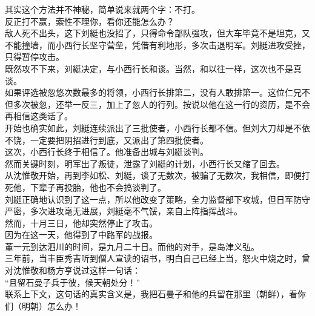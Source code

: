 \begin{multicols}{\theparacolNo}
其实这个方法并不神秘，简单说来就两个字：不打。\\

反正打不赢，索性不理你，看你还能怎么办？\\

敌人死不出头，这下刘綎也没招了，只得命令部队强攻，但大车毕竟不是坦克，又不能撞墙，而小西行长坚守营垒，凭借有利地形，多次击退明军。刘綎进攻受挫，只得暂停攻击。\\

既然攻不下来，刘綎决定，与小西行长和谈。当然，和以往一样，这次也不是真谈。\\

如果评选被忽悠次数最多的将领，小西行长排第二，没有人敢排第一。这位仁兄不但多次被忽，还举一反三，加上了忽人的行列。按说以他在这一行的资历，是不会再相信这类话了。\\

开始也确实如此，刘綎连续派出了三批使者，小西行长都不信。但刘大刀却是不依不饶，一定要把阴招进行到底，又派出了第四批使者。\\

这次，小西行长终于相信了。他准备出城与刘綎谈判。\\

然而关键时刻，明军出了叛徒，泄露了刘綎的计划，小西行长又缩了回去。\\

从沈惟敬开始，再到李如松、刘綎，谈了无数次，被骗了无数次，我相信，即便打死他，下辈子再投胎，他也不会搞谈判了。\\

刘綎正确地认识到了这一点，所以他改变了策略，全力监督部下攻城，但日军防守严密，多次进攻毫无进展，刘綎毫不气馁，亲自上阵指挥战斗。\\

然而，十月三日，他却突然停止了攻击。\\

因为在这一天，他得到了中路军的战报。\\

董一元到达泗川的时间，是九月二十日。而他的对手，是岛津义弘。\\

三年前，当丰臣秀吉听到僧人宣读的诏书，明白自己已经上当，怒火中烧之时，曾对沈惟敬和杨方亨说过这样一句话：\\

“且留石曼子兵于彼，候天朝处分！”\\

联系上下文，这句话的真实含义是，我把石曼子和他的兵留在那里（朝鲜），看你们（明朝）怎么办！\\


\end{multicols}
